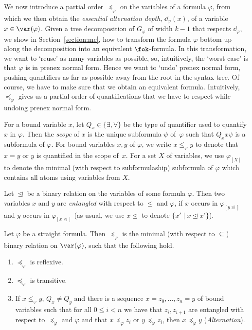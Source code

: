 \documentclass{LMCS}
\newcommand{\gfi}{G_{\varphi}}
\renewcommand{\phi}{\varphi}
\newcommand{\ad}{\dd_{\varphi}}
\newcommand{\alt}{Alternation}
\begin{document}
We now introduce a partial order $\preceq_{\phi}$ on the variables of a
formula $\phi$, from which we then obtain the \emph{essential alternation depth},
$\ad(x)$, of a variable $x\in\var(\phi)$. 
Given a tree decomposition
of $\gfi$ of width $k-1$ that respects $\ad$, 
we show in Section~\ref{section:mc}, how to transform the formula $\phi$
bottom up along the decomposition into an equivalent $\fok$-formula.
In this transformation, we want to `reuse' as many variables as possible,
so, intuitively, the `worst case' is that $\phi$ is in prenex normal form. 
Hence we want to 
`undo' prenex normal form, pushing quantifiers as far as possible 
away from the root 
in the syntax tree. Of course, we have to make sure that we 
obtain an equivalent formula. Intuitively, $\preceq_{\phi}$
gives us a partial order of quantifications that we
have to respect while undoing prenex normal form.

For a bound variable $x$, let $Q_x\in\{\exists,\forall\}$ 
be the type of quantifier used to quantify $x$ in $\phi$. 
Then the \emph{scope} of $x$ 
is the unique subformula $\psi$ of~$\phi$ 
such that $Q_xx\psi$ is a subformula of $\phi$. 
For bound variables $x,y$ of $\phi$, we write $x\leq_{\phi}y$ to denote 
that $x=y$ or $y$ is quantified in the scope of~$x$. 
For a set $X$ of variables, we use $\phi_{[X]}$ to denote 
the minimal (with respect to subformulaship) subformula of $\phi$ 
which contains all atoms using variables from $X$. 

\begin{defi}
Let $\trianglelefteq$ be a binary relation 
on the variables of some formula $\phi$. 
Then two variables $x$ and $y$ are 
\emph{entangled} with respect to $\trianglelefteq$ and $\phi$, 
if $x$ occurs in $\phi_{[y\trianglelefteq]}$ 
and $y$ occurs in $\phi_{[x\trianglelefteq]}$ 
(as usual, we use $x\trianglelefteq$ 
to denote $\{x'\mid x\trianglelefteq x'\}$). 
\end{defi}

\begin{defi}\label{defi:preceq}
Let $\phi$ be a straight formula. 
Then $\preceq_{\phi}$ is the minimal (with respect to $\subseteq$) 
binary relation on $\var(\phi)$, 
such that the following hold. 
\begin{enumerate}[(1)]
\item $\preceq_{\phi}$ is reflexive. 
\item $\preceq_{\phi}$ is transitive. 
\item If $x\leq_{\phi}y$, $Q_x\not=Q_y$ 
  and there is a sequence $x=z_0,\ldots,z_n=y$ of bound variables 
  such that for all $0\leq i<n$ we have that $z_i,z_{i+1}$ are entangled
  with respect to $\preceq_{\phi}$ and $\phi$ 
  and that $x\preceq_{\phi}z_i$ or $y\preceq_{\phi}z_i$, 
  then $x\preceq_{\phi}y$ (\emph{\alt}). 
\end{enumerate}
\end{defi}
\end{document}
